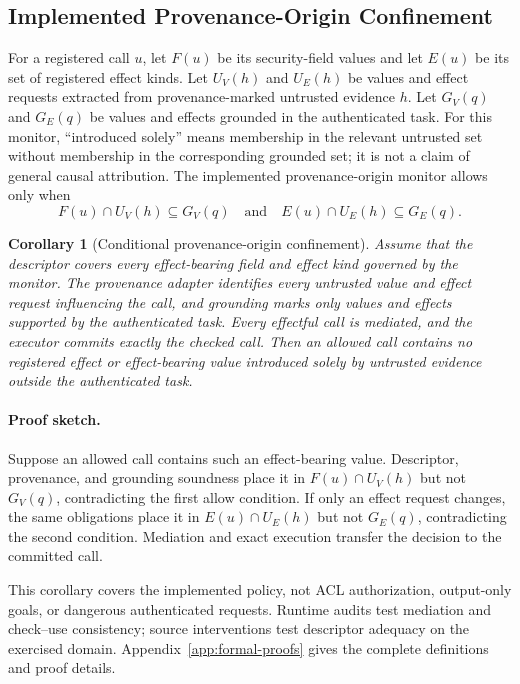 \documentclass[letterpaper,twocolumn,10pt]{article}
\newtheorem{corollary}[theorem]{Corollary}
\theoremstyle{definition}
\begin{document}
\subsection{Implemented Provenance-Origin Confinement}

For a registered call $u$, let $F(u)$ be its security-field values and let
$E(u)$ be its set of registered effect kinds.  Let $U_V(h)$ and $U_E(h)$ be
values and effect requests extracted from provenance-marked untrusted evidence
$h$.  Let $G_V(q)$ and $G_E(q)$ be values and effects grounded in the
authenticated task.  For this monitor, ``introduced solely'' means membership
in the relevant untrusted set without membership in the corresponding grounded
set; it is not a claim of general causal attribution.  The implemented
provenance-origin monitor allows only when
\[
  F(u)\cap U_V(h)\subseteq G_V(q)
  \quad\text{and}\quad
  E(u)\cap U_E(h)\subseteq G_E(q).
\]

\begin{corollary}[Conditional provenance-origin confinement]
\label{thm:single-commit}
Assume that the descriptor covers every effect-bearing field and effect kind
governed by the monitor.  The provenance adapter identifies every untrusted
value and effect request influencing the call, and grounding marks only values
and effects supported by the authenticated task.  Every effectful call is
mediated, and the executor commits exactly the checked call.  Then an allowed
call contains no registered effect or effect-bearing value introduced solely
by untrusted evidence outside the authenticated task.
\end{corollary}

\paragraph{Proof sketch.}
Suppose an allowed call contains such an effect-bearing value.  Descriptor,
provenance, and grounding soundness place it in $F(u)\cap U_V(h)$ but not
$G_V(q)$, contradicting the first allow condition.  If only an effect request
changes, the same obligations place it in $E(u)\cap U_E(h)$ but not $G_E(q)$,
contradicting the second condition.  Mediation and exact execution transfer the
decision to the committed call.

This corollary covers the implemented policy, not ACL authorization,
output-only goals, or dangerous authenticated requests.  Runtime audits test
mediation and check--use consistency; source interventions test descriptor
adequacy on the exercised domain.
Appendix~\ref{app:formal-proofs} gives the complete definitions and proof
details.
\end{document}
